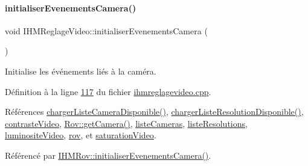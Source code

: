 \paragraph{\texorpdfstring{initialiser\+Evenements\+Camera()}{initialiserEvenementsCamera()}}
{\footnotesize\ttfamily void I\+H\+M\+Reglage\+Video\+::initialiser\+Evenements\+Camera (\begin{DoxyParamCaption}{ }\end{DoxyParamCaption})}



Initialise les événements liés à la caméra. 



Définition à la ligne \hyperlink{ihmreglagevideo_8cpp_source_l00117}{117} du fichier \hyperlink{ihmreglagevideo_8cpp_source}{ihmreglagevideo.\+cpp}.



Références \hyperlink{ihmreglagevideo_8cpp_source_l00132}{charger\+Liste\+Camera\+Disponible()}, \hyperlink{ihmreglagevideo_8cpp_source_l00172}{charger\+Liste\+Resolution\+Disponible()}, \hyperlink{ihmreglagevideo_8h_source_l00035}{contraste\+Video}, \hyperlink{rov_8cpp_source_l00144}{Rov\+::get\+Camera()}, \hyperlink{ihmreglagevideo_8h_source_l00038}{liste\+Cameras}, \hyperlink{ihmreglagevideo_8h_source_l00040}{liste\+Resolutions}, \hyperlink{ihmreglagevideo_8h_source_l00034}{luminosite\+Video}, \hyperlink{ihmreglagevideo_8h_source_l00027}{rov}, et \hyperlink{ihmreglagevideo_8h_source_l00036}{saturation\+Video}.



Référencé par \hyperlink{ihmrov_8cpp_source_l00229}{I\+H\+M\+Rov\+::initialiser\+Evenements\+Camera()}.


